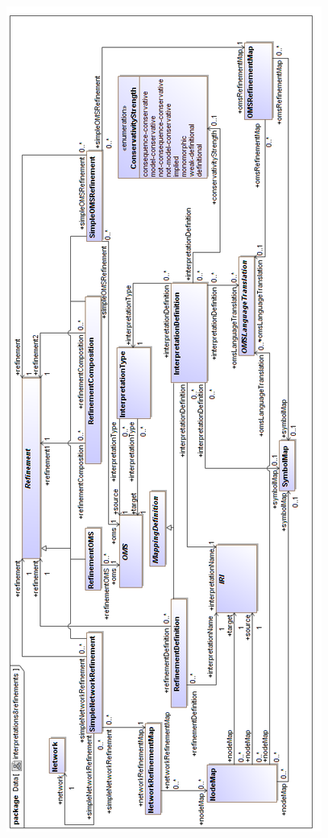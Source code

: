 \documentclass[10pt,fleqn,final]{scrreprt}
\newenvironment{definitions}[0]{\medskip }{}
\begin{document}
\begin{definitions}
\medskip
\begin{center}
\includegraphics[scale=0.47]{mof/interpretations&refinements.png}
\end{center}



\end{definitions}
\end{document}
